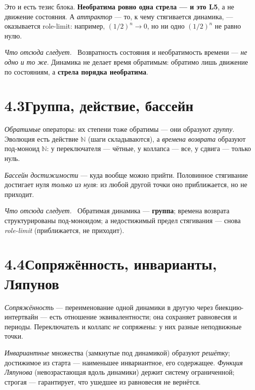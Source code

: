 \documentclass[12pt,a4paper]{article}
\newcommand{\rezultat}{\medskip\noindent\emph{Что отсюда следует.}\ }
\begin{document}
Это и есть тезис блока. \textbf{Необратима ровно одна стрела --- и это L5}, а не движение состояния.
А \emph{аттрактор} --- то, к чему стягивается динамика, --- оказывается role-limit: например,
$(1/2)^n \to 0$, но ни одно $(1/2)^n$ не равно нулю.

\rezultat
Возвратность состояния и необратимость времени --- \emph{не одно и то же}. Динамика не делает время
обратимым: обратимо лишь движение по состояниям, а \textbf{стрела порядка необратима}.

\section*{4.3\quad Группа, действие, бассейн}

\emph{Обратимые} операторы: их степени тоже обратимы --- они образуют \emph{группу}. Эволюция есть
действие $\mathbb{N}$ (шаги складываются), а \emph{времена возврата} образуют под-моноид
$\mathbb{N}$: у переключателя --- чётные, у коллапса --- все, у сдвига --- только нуль.

\emph{Бассейн достижимости} --- куда вообще можно прийти. Половинное стягивание достигает нуля
\emph{только из нуля}: из любой другой точки оно приближается, но не приходит.

\rezultat
Обратимая динамика --- \textbf{группа}; времена возврата структурированы под-моноидом; а недостижимый
предел стягивания --- снова \emph{role-limit} (приближается, не приходит).

\section*{4.4\quad Сопряжённость, инварианты, Ляпунов}

\emph{Сопряжённость} --- переименование одной динамики в другую через биекцию-интертвайн ---
есть отношение эквивалентности; она сохраняет равновесия и периоды. Переключатель и коллапс
\emph{не} сопряжены: у них разные неподвижные точки.

\emph{Инвариантные} множества (замкнутые под динамикой) образуют \emph{решётку}; достижимое из старта
--- наименьшее инвариантное, его содержащее. \emph{Функция Ляпунова} (невозрастающая вдоль динамики)
держит систему ограниченной; строгая --- гарантирует, что ушедшее из равновесия не вернётся.
\end{document}
